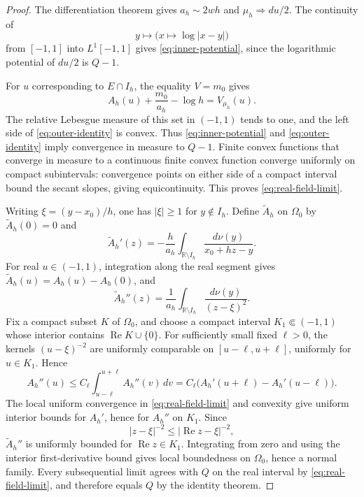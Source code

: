 \documentclass[11pt]{article}
\theoremstyle{definition}
\numberwithin{equation}{section}
\newcommand{\R}{\mathbb R}
\begin{document}
\begin{proof}
The differentiation theorem gives \(a_h\sim2wh\) and
\(\mu_h\Rightarrow du/2\). The continuity of
\[
 y\longmapsto\bigl(x\longmapsto\log|x-y|\bigr)
\]
from \([-1,1]\) into \(L^1[-1,1]\) gives
\eqref{eq:inner-potential}, since the logarithmic potential of
\(du/2\) is \(Q-1\).

For \(u\) corresponding to \(E\cap I_h\), the equality \(V=m_0\)
gives
\begin{equation}\label{eq:outer-identity}
 A_h(u)+\frac{m_0}{a_h}-\log h=V_{\mu_h}(u).
\end{equation}
The relative Lebesgue measure of this set in \((-1,1)\) tends
to one, and the left side of \eqref{eq:outer-identity} is convex.
Thus \eqref{eq:inner-potential} and \eqref{eq:outer-identity} imply
convergence in measure to \(Q-1\). Finite convex functions that
converge in measure to a continuous finite convex function converge
uniformly on compact subintervals: convergence points on either side
of a compact interval bound the secant slopes, giving equicontinuity.
This proves \eqref{eq:real-field-limit}.

Writing \(\xi=(y-x_0)/h\), one has \(|\xi|\ge1\) for
\(y\notin I_h\). Define \(\widetilde A_h\) on \(\Omega_0\) by
\(\widetilde A_h(0)=0\) and
\[
 \widetilde A_h'(z)
 =-\frac{h}{a_h}\int_{\R\setminus I_h}
   \frac{d\nu(y)}{x_0+hz-y}.
\]
For real \(u\in(-1,1)\), integration along the real segment gives
\(\widetilde A_h(u)=A_h(u)-A_h(0)\), and
\[
 \widetilde A_h''(z)
 =\frac1{a_h}\int_{\R\setminus I_h}\frac{d\nu(y)}{(z-\xi)^2}.
\]
Fix a compact subset \(K\) of \(\Omega_0\), and choose a compact
interval \(K_1\Subset(-1,1)\) whose interior contains
\(\operatorname{Re}K\cup\{0\}\).
For sufficiently small fixed \(\ell>0\), the kernels
\((u-\xi)^{-2}\) are uniformly comparable on
\([u-\ell,u+\ell]\), uniformly for \(u\in K_1\). Hence
\[
 A_h''(u)
 \le C_\ell\int_{u-\ell}^{u+\ell}A_h''(v)\,dv
 =C_\ell\bigl(A_h'(u+\ell)-A_h'(u-\ell)\bigr).
\]
The local uniform convergence in \eqref{eq:real-field-limit} and
convexity give uniform interior bounds for \(A_h'\), hence for
\(A_h''\) on \(K_1\). Since
\[
 |z-\xi|^{-2}\le|\operatorname{Re}z-\xi|^{-2},
\]
\(\widetilde A_h''\) is uniformly bounded for
\(\operatorname{Re}z\in K_1\). Integrating from zero and using the
interior first-derivative bound gives local boundedness on \(\Omega_0\),
hence a normal family. Every subsequential limit agrees
with \(Q\) on the real interval by \eqref{eq:real-field-limit}, and
therefore equals \(Q\) by the identity theorem.
\end{proof}
\end{document}
